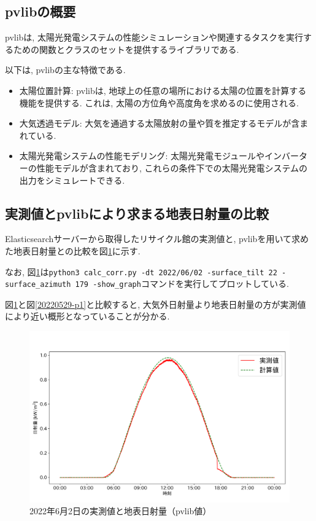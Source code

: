 \subsection{pvlibの概要}
pvlibは, 太陽光発電システムの性能シミュレーションや関連するタスクを実行するための関数とクラスのセットを提供するライブラリである. 

以下は, pvlibの主な特徴である.

\begin{itemize}
  \item 太陽位置計算: pvlibは, 地球上の任意の場所における太陽の位置を計算する機能を提供する. これは, 太陽の方位角や高度角を求めるのに使用される.
  \item 大気透過モデル: 大気を通過する太陽放射の量や質を推定するモデルが含まれている.
  \item 太陽光発電システムの性能モデリング: 太陽光発電モジュールやインバーターの性能モデルが含まれており, これらの条件下での太陽光発電システムの出力をシミュレートできる.
\end{itemize}

\subsection{実測値とpvlibにより求まる地表日射量の比較}
Elasticsearchサーバーから取得したリサイクル館の実測値と, pvlibを用いて求めた地表日射量との比較を図\ref{2-p1}に示す.

なお, 図\ref{2-p1}は\texttt{python3 calc_corr.py -dt 2022/06/02 -surface_tilt 22 -surface_azimuth 179 -show_graph}コマンドを実行してプロットしている.

図\ref{2-p1}と図\ref{20220529-p1}と比較すると, 大気外日射量より地表日射量の方が実測値により近い概形となっていることが分かる.

\begin{figure}[H]
  \hspace*{-1cm}
  \centering
  \includegraphics[width=160mm]{sotu/figure/2/pvlib-20220602-corr.png}
  \caption{2022年6月2日の実測値と地表日射量（pvlib値）}
  \label{2-p1}
\end{figure}

